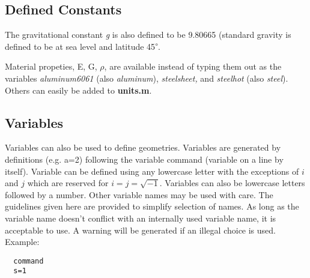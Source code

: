 \documentclass[12pt]{article}
\newcommand*{\command}[1]{\textsf{#1}}
\newcommand*{\variable}[1]{\textit{#1}}
\newcommand*{\filename}[1]{\textsf{\textbf{#1}}}
\begin{document}
\subsection{Defined Constants}
The gravitational constant \variable{g} is also defined to be 9.80665 (standard gravity is defined to be at sea level and latitude 45\textsuperscript{$\circ$}. 

Material propeties, E, G, $\rho$, are available instead of typing them out as the variables \variable{aluminum6061} (also \variable{aluminum}), \variable{steelsheet,} and \variable{steelhot} (also \variable{steel}). Others can easily be added to \filename{units.m}.

\subsection{Variables}
Variables can also be used to define geometries.
Variables are generated by definitions (e.g. \command{a=2}) following
the variable command (\command{variable} on a line by itself).
Variable can be defined using any lowercase letter with the
exceptions of $i$ and $j$ which are reserved for $i=j=\sqrt{-1}$.
Variables can also be lowercase letters followed by a number. Other
variable names may be used with care. The guidelines given here are
provided to simplify selection of names. As long as the variable name
doesn't conflict with an internally used variable name, it is
acceptable to use. A warning will be generated if an illegal choice is
used.
\\Example:\\
\begin{lstlisting}
  command
  s=1
\end{lstlisting}
\end{document}

